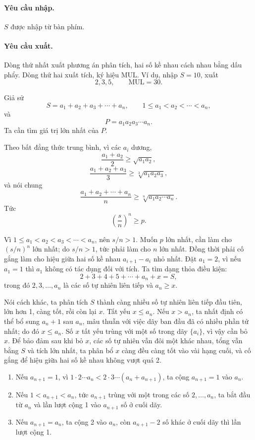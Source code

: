 \documentclass[11pt]{article}
\begin{document}
\paragraph{Yêu cầu nhập.}
\(S\) được nhập từ bàn phím.

\paragraph{Yêu cầu xuất.}
Dòng thứ nhất xuất phương án phân tích, hai số kề nhau cách nhau bằng dấu
phẩy. Dòng thứ hai xuất tích, ký hiệu \(\mathrm{MUL}\). Ví dụ, nhập
\(S=10\), xuất
\[
  2,3,5,\qquad \mathrm{MUL}=30.
\]

Giả sử
\[
  S=a_1+a_2+a_3+\cdots+a_n,\qquad 1\le a_1<a_2<\cdots<a_n,
\]
và
\[
  P=a_1a_2a_3\cdots a_n.
\]
Ta cần tìm giá trị lớn nhất của \(P\).

Theo bất đẳng thức trung bình, vì các \(a_i\) dương,
\[
  \frac{a_1+a_2}{2}\ge\sqrt{a_1a_2},
\]
\[
  \frac{a_1+a_2+a_3}{3}\ge\sqrt[3]{a_1a_2a_3},
\]
và nói chung
\[
  \frac{a_1+a_2+\cdots+a_n}{n}\ge\sqrt[n]{a_1a_2\cdots a_n}.
\]
Tức
\[
  \left(\frac{s}{n}\right)^n\ge p.
\]

Vì \(1\le a_1<a_2<a_3<\cdots<a_n\), nên \(s/n>1\). Muốn \(p\) lớn nhất, cần
làm cho \((s/n)^n\) lớn nhất; do \(s/n>1\), tức phải làm cho \(n\) lớn nhất.
Đồng thời phải cố gắng làm cho hiệu giữa hai số kề nhau \(a_{i+1}-a_i\) nhỏ
nhất. Đặt \(a_1=2\), vì nếu \(a_1=1\) thì \(a_1\) không có tác dụng đối với
tích. Ta tìm dạng thỏa điều kiện:
\[
  2+3+4+5+\cdots+a_n+x=S,
\]
trong đó \(2,3,\ldots,a_n\) là các số tự nhiên liên tiếp và \(a_n\ge x\).

Nói cách khác, ta phân tích \(S\) thành càng nhiều số tự nhiên liên tiếp đầu
tiên, lớn hơn 1, càng tốt, rồi còn lại \(x\). Tất yếu \(x\le a_n\). Nếu
\(x>a_n\), ta nhất định có thể bổ sung \(a_n+1\) sau \(a_n\), mâu thuẫn với
việc dãy ban đầu đã có nhiều phần tử nhất; do đó \(x\le a_n\). Số \(x\) tất
yếu trùng với một số trong dãy \(\{a_i\}\), vì vậy cần bỏ \(x\). Để bảo đảm
sau khi bỏ \(x\), các số tự nhiên vẫn đôi một khác nhau, tổng vẫn bằng \(S\)
và tích lớn nhất, ta phân bổ \(x\) càng đều càng tốt vào vài hạng cuối, và cố
gắng để hiệu giữa hai số kề nhau không vượt quá 2.

\begin{enumerate}
  \item Nếu \(a_{n+1}=1\), vì
  \(1\cdot2\cdots a_n<2\cdot3\cdots(a_n+a_{n+1})\), ta cộng
  \(a_{n+1}=1\) vào \(a_n\).
  \item Nếu \(1<a_{n+1}<a_n\), tức \(a_{n+1}\) trùng với một trong các số
  \(2,\ldots,a_n\), ta bắt đầu từ \(a_n\) và lần lượt cộng 1 vào
  \(a_{n+1}\) số ở cuối dãy.
  \item Nếu \(a_{n+1}=a_n\), ta cộng 2 vào \(a_n\), còn
  \(a_{n+1}-2\) số khác ở cuối dãy thì lần lượt cộng 1.
\end{enumerate}
\end{document}
